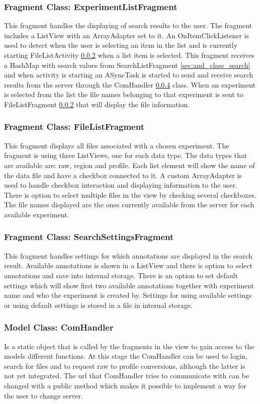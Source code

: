 \subsubsection{Fragment Class: ExperimentListFragment}
This fragment handles the displaying of search results to the user. The fragment includes a ListView with an ArrayAdapter set to it. An OnItemClickListener is used to detect when the user is selecting an item in the list and is currently starting FileListActivity \ref{sec:and_class_filelist} when a list item is selected. This fragment receives a HashMap with search values from SearchListFragment \ref{sec:and_class_search} and when activity is starting an ASyncTask is started to send and receive search results from the server through the ComHandler \ref{sec:and_class_comhandler} class. When an experiment is selected from the list the file names belonging to that experiment is sent to FileListFragment \ref{sec:and_class_filelist} that will display the file information. 
\subsubsection{Fragment Class: FileListFragment}\label{sec:and_class_filelist}
This fragment displays all files associated with a chosen experiment. The fragment is using three ListViews, one for each data type. The data types that are available are: raw, region and profile. Each list element will show the name of the data file and have a checkbox connected to it. A custom ArrayAdapter is used to handle checkbox interaction and displaying information to the user. There is option to select multiple files in the view by checking several checkboxes. The file names displayed are the ones currently available from the server for each available experiment.
\subsubsection{Fragment Class: SearchSettingsFragment}
This fragment handles settings for which annotations are displayed in the search result. Available annotations is shown in a ListView and there is option to select annotations and save into internal storage. There is an option to set default settings which will show first two available annotations together with experiment name and who the experiment is created by. Settings for using available settings or using default settings is stored in a file in internal storage.
\subsubsection{Model Class: ComHandler}\label{sec:and_class_comhandler}
Is a static object that is called by the fragments in the view to gain access to the models different functions. At this stage the ComHandler can be used to login, search for files and to request raw to profile conversions, although the latter is not yet integrated. The url that ComHandler tries to communicate with can be changed with a public method which makes it possible to implement a way for the user to change server.
